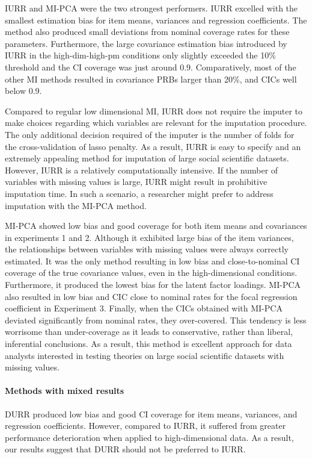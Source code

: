 	IURR and MI-PCA were the two strongest performers.
	IURR excelled with the smallest estimation bias for item means, variances and regression coefficients.
	The method also produced small deviations from nominal coverage rates for these parameters.
	Furthermore, the large covariance estimation bias introduced by IURR in the high-dim-high-pm conditions
	only slightly exceeded the 10\% threshold and the CI coverage was just around 0.9.
	Comparatively, most of the other MI methods resulted in covariance PRBs larger than 20\%, and CICs 
	well below 0.9.

	Compared to regular low dimensional MI, IURR does not require the imputer to make choices regarding which variables
	are relevant for the imputation procedure.
	The only additional decision required of the imputer is the number of folds for the cross-validation of lasso 
	penalty.
	As a result, IURR is easy to specify and an extremely appealing method for imputation of large social scientific 
	datasets.
	However, IURR is a relatively computationally intensive.
	If the number of variables with missing values is large, IURR might result in prohibitive imputation time.
	In such a scenario, a researcher might prefer to address imputation with the MI-PCA method.

	MI-PCA showed low bias and good coverage for both item means and covariances in experiments 1 and 2.
	Although it exhibited large bias of the item variances, the relationships between variables with missing values 
	were always correctly estimated.
	It was the only method resulting in low bias and close-to-nominal CI coverage of the true covariance values,
	even in the high-dimensional conditions.
	Furthermore, it produced the lowest bias for the latent factor loadings.	
	MI-PCA also resulted in low bias and CIC close to nominal rates for the focal regression coefficient
	in Experiment 3.
	Finally, when the CICs obtained with MI-PCA deviated significantly from nominal rates, they over-covered.
	This tendency is less worrisome than under-coverage as it leads to conservative, rather than liberal, 
	inferential conclusions.
	As a result, this method is excellent approach for data analysts interested in testing theories on 
	large social scientific datasets with missing values.

\paragraph{Methods with mixed results}
	DURR produced low bias and good CI coverage for item means, variances, and regression coefficients.
	However, compared to IURR, it suffered from greater performance deterioration when applied to 
	high-dimensional data. 
	As a result, our results suggest that DURR should not be preferred to IURR.

